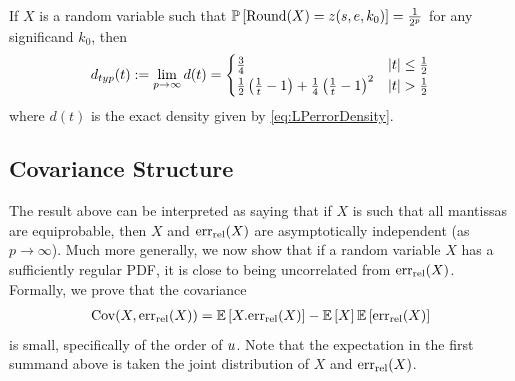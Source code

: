 \begin{theorem}\label{thm:typical_dist}
If $X$ is a random variable such that $\mathbb{P}\left[ \mathrm{Round}(X) = z(s,e,k_0) \right]=\frac{1}{2^p}$ for any significand $k_0$, then
\begin{align}
d_{typ}(t)\mathrel{:=} \lim_{p\to\infty} d(t) = \begin{cases}
\frac{3}{4}&\left\lvert t\right\rvert\leq\frac{1}{2}
\\
\frac{1}{2}\left(\frac{1}{t}-1\right)+\frac{1}{4}\left(\frac{1}{t}-1\right)^2 & \left\lvert t\right\rvert>\frac{1}{2}
\end{cases}\label{eq:typicalpdf}
\end{align} 
where $d(t)$ is the exact density given by \cref{eq:LPerrorDensity}.
\end{theorem}

\subsection{Covariance Structure}\label{subsec:covar}

The result above can be interpreted as saying that if $X$ is such that all mantissas are equiprobable, then $X$ and $\mathrm{err}_{\mathrm{rel}}(X)$ are asymptotically independent (as $p\to\infty$).  Much more generally,  we now show that if a random variable $X$ has a sufficiently regular PDF, it is close to being uncorrelated from $\mathrm{err}_{\mathrm{rel}}(X)$. Formally, we prove that the covariance 
\begin{align}
\mathrm{Cov}(X,\mathrm{err}_{\mathrm{rel}}(X)) = \mathbb{E}\left[X.\mathrm{err}_{\mathrm{rel}}(X)\right]-\mathbb{E}\left[X\right]\mathbb{E}\left[\mathrm{err}_{\mathrm{rel}}(X)\right]
\label{eq:covdef}
\end{align}
is small, specifically of the order of $u$. Note that the expectation in the first summand above is taken \wrt the joint distribution of $X$ and $\mathrm{err}_{\mathrm{rel}}(X)$.


